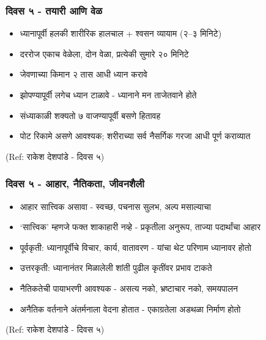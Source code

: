 \begin{frame}[fragile]\frametitle{दिवस ५ - तयारी आणि वेळ}

	\begin{itemize}
	\item ध्यानापूर्वी हलकी शारीरिक हालचाल + श्वसन व्यायाम (२--३ मिनिटे)
	\item दररोज एकाच वेळेला, दोन वेळा, प्रत्येकी सुमारे २० मिनिटे
	\item जेवणाच्या किमान २ तास आधी ध्यान करावे
	\item झोपण्यापूर्वी लगेच ध्यान टाळावे - ध्यानाने मन ताजेतवाने होते
	\item संध्याकाळी शक्यतो ७ वाजण्यापूर्वी बसणे हितावह
	\item पोट रिकामे असणे आवश्यक; शरीराच्या सर्व नैसर्गिक गरजा आधी पूर्ण कराव्यात
	\end{itemize}

{\tiny (Ref: राकेश देशपांडे - दिवस ५)}

\end{frame}

\begin{frame}[fragile]\frametitle{दिवस ५ - आहार, नैतिकता, जीवनशैली}

	\begin{itemize}
	\item आहार सात्त्विक असावा - स्वच्छ, पचनास सुलभ, अल्प मसाल्याचा
	\item `सात्त्विक' म्हणजे फक्त शाकाहारी नव्हे - प्रकृतीला अनुरूप, ताज्या पदार्थांचा आहार
	\item पूर्वकृती: ध्यानापूर्वीचे विचार, कार्य, वातावरण - यांचा थेट परिणाम ध्यानावर होतो
	\item उत्तरकृती: ध्यानानंतर मिळालेली शांती पुढील कृतींवर प्रभाव टाकते
	\item नैतिकतेची पायाभरणी आवश्यक - असत्य नको, भ्रष्टाचार नको, समयपालन
	\item अनैतिक वर्तनाने अंतर्मनाला वेदना होतात - एकाग्रतेला अडथळा निर्माण होतो
	\end{itemize}

{\tiny (Ref: राकेश देशपांडे - दिवस ५)}

\end{frame}

